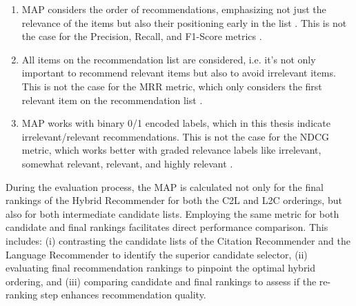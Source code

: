 \begin{enumerate}
    \item \ac{MAP} considers the order of recommendations, emphasizing not just the relevance of the items but also their positioning early in the list \cite{TaifiMRRVs2020,RinkMeanAverage2023}. This is not the case for the Precision, Recall, and F1-Score metrics \cite{BaiScientificPaper2020}.
    \item All items on the recommendation list are considered, i.e. it's not only important to recommend relevant items but also to avoid irrelevant items. This is not the case for the \ac{MRR} metric, which only considers the first relevant item on the recommendation list \cite{SilveiraHowGood2019}.
    \item \ac{MAP} works with binary 0/1 encoded labels, which in this thesis indicate irrelevant/relevant recommendations. This is not the case for the \ac{NDCG} metric, which works better with graded relevance labels like irrelevant, somewhat relevant, relevant, and highly relevant \cite{SilveiraHowGood2019}.
\end{enumerate}

During the evaluation process, the \ac{MAP} is calculated not only for the final rankings of the Hybrid Recommender for both the \ac{C2L} and \ac{L2C} orderings, but also for both intermediate candidate lists.
Employing the same metric for both candidate and final rankings facilitates direct performance comparison. This includes: (i) contrasting the candidate lists of the Citation Recommender and the Language Recommender to identify the superior candidate selector, (ii) evaluating final recommendation rankings to pinpoint the optimal hybrid ordering, and (iii) comparing candidate and final rankings to assess if the re-ranking step enhances recommendation quality.
